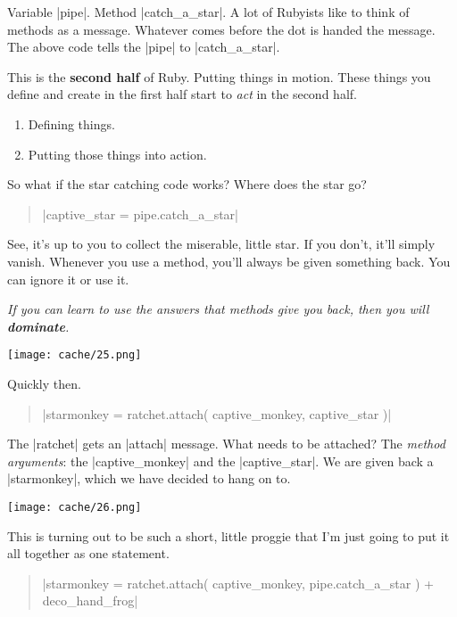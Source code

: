 \documentclass[12pt,twoside]{report}
\begin{document}
Variable \rubyinline|pipe|.  Method
\rubyinline|catch_a_star|.  A lot of Rubyists like to
think of methods as a message. Whatever comes before the dot is handed
the message.  The above code tells the
\rubyinline|pipe| to
\rubyinline|catch_a_star|.

This is the {\bf second half} of Ruby.  Putting things in motion.
These things you define and create in the first half start to {\em
  act} in the second half.

\begin{enumerate}
\item Defining things.
\item Putting those things into action.
\end{enumerate}

So what if the star catching code works?  Where does the star go?

\begin{quote}
\rubyinline|captive_star = pipe.catch_a_star|\end{quote}


See, it's up to you to collect the miserable, little star.  If you
don't, it'll simply vanish. Whenever you use a method, you'll always
be given something back.  You can ignore it or use it.

{\em If you can learn to use the answers that methods give you back,
  then you will {\bf dominate}.}

	\texttt{[image: cache/25.png]}

Quickly then.

\begin{quote}
\rubyinline|starmonkey = ratchet.attach( captive_monkey, captive_star )|\end{quote}


The \rubyinline|ratchet| gets an
\rubyinline|attach| message.  What needs to be
attached?  The {\em method arguments}: the
\rubyinline|captive_monkey| and the
\rubyinline|captive_star|.  We are given back a
\rubyinline|starmonkey|, which we have decided to hang
on to.

	\texttt{[image: cache/26.png]}

This is turning out to be such a short, little proggie that I'm just
going to put it all together as one statement.

\begin{quote}
\rubyinline|starmonkey = ratchet.attach( captive_monkey, pipe.catch_a_star ) + deco_hand_frog|\end{quote}
\end{document}
